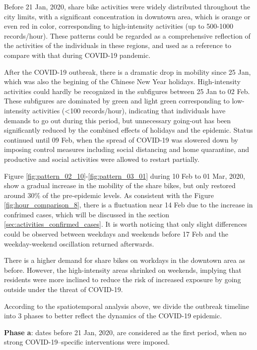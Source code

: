 \documentclass[preprints,ijgi,submit,moreauthors]{Definitions/mdpi}
\begin{document}
Before 21 Jan, 2020, share bike activities were widely distributed throughout the city limits, with a significant concentration in downtown area, which is orange or even red in color, corresponding to high-intensity activities (up to 500-1000 records/hour).
These patterns could be regarded as a comprehensive reflection of the activities of the individuals in these regions, and used as a reference to compare with that during COVID-19 pandemic.

After the COVID-19 outbreak, there is a dramatic drop in mobility since 25 Jan, which was also the begining of the Chinese New Year holidays.
High-intensity activities could hardly be recognized in the subfigures between 25 Jan to 02 Feb. 
These subfigures are dominated by green and light green corresponding to low-intensity activities (<100 records/hour), indicating that individuals have demands to go out during this period, but unnecessary going-out has been significantly reduced by the combined effects of holidays and the epidemic.
Status continued until 09 Feb, when the spread of COVID-19 was slowered down by imposing control measures including social distancing and home quarantine, and productive and social activities were allowed to restart partially.

Figure \ref{fig:pattern_02_10}-\ref{fig:pattern_03_01} during 10 Feb to 01 Mar, 2020, show a gradual increase in the mobility of the share bikes, but only restored around $30\%$ of the pre-epidemic levels.
As consistent with the Figure \ref{fig:hour_comparison_8}, there is a fluctuation near 14 Feb due to the increase in confrimed cases, which will be discussed in the section \ref{sec:activities_confirmed_cases}.
It is worth noticing that only slight differences could be observed between weekdays and weekends before 17 Feb and the weekday-weekend oscillation returned afterwards.

There is a higher demand for share bikes on workdays in the downtown area as before.
However, the high-intensity areas shrinked on weekends, implying that residents were more inclined to reduce the risk of increased exposure by going outside under the threat of COVID-19. 

According to the spatiotemporal analysis above, we divide the outbreak timeline into 3 phases to better reflect the dynamics of the COVID-19 epidemic.

\textbf{Phase a}: dates before 21 Jan, 2020, are considered as the first period, when no strong COVID-19–specific interventions were imposed.
\end{document}
